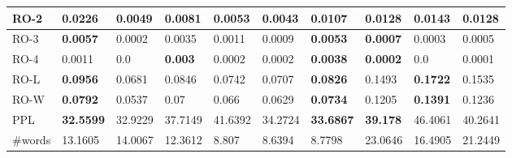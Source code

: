 \begin{table}
\begin{tabular}{|l|l|l|l|l|l|l|l|l|l|}
        RO{-}2 & \textbf{0.0226} & 0.0049 & 0.0081 & 0.0053 & 0.0043 & \textbf{0.0107} & 0.0128 & \textbf{0.0143} & 0.0128\\\hline
        RO{-}3 & \textbf{0.0057} & 0.0002 & 0.0035 & 0.0011 & 0.0009 & \textbf{0.0053} & \textbf{0.0007} & 0.0003 & 0.0005\\\hline
        RO{-}4 & 0.0011 & 0.0 & \textbf{0.003} & 0.0002 & 0.0002 & \textbf{0.0038} & \textbf{0.0002} & 0.0 & 0.0001\\\hline
        RO{-}L & \textbf{0.0956} & 0.0681 & 0.0846 & 0.0742 & 0.0707 & \textbf{0.0826} & 0.1493 & \textbf{0.1722} & 0.1535\\\hline
        RO{-}W & \textbf{0.0792} & 0.0537 & 0.07 & 0.066 & 0.0629 & \textbf{0.0734} & 0.1205 & \textbf{0.1391} & 0.1236\\\hline
        PPL & \textbf{32.5599} & 32.9229 & 37.7149 & 41.6392 & 34.2724 & \textbf{33.6867} & \textbf{39.178} & 46.4061 & 40.2641\\\hline
        \#words & 13.1605 & 14.0067 & 12.3612 & 8.807 & 8.6394 & 8.7798 & 23.0646 & 16.4905 & 21.2449\\
        \hline
    \end{tabular}
\end{table}